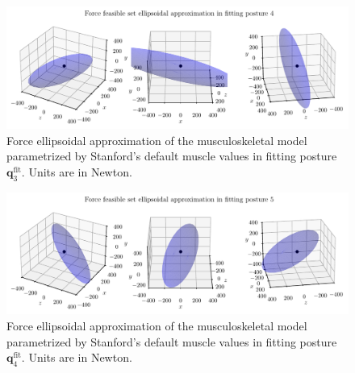 \clearpage
\begin{figure}[!htb]
    \centering
    \captionsetup{justification=centering}
    \begin{minipage}{\linewidth}
        \centering
        \includegraphics[trim={0 0 0 0}, clip, width=1\linewidth]{img/chapter_4/reconstruction_stanford_imgs/STANFORD_ELLIPSOID_POSTURE_FITTING_04.pdf}
    \end{minipage}
    \caption{Force ellipsoidal approximation of the musculoskeletal model parametrized by Stanford's default muscle values in fitting posture $\mathbf{q}_3^{\text{fit}}$. Units are in Newton.}
    \label{fig:ellipsoid_pose_4}
\end{figure}

\begin{figure}[!htb]
    \centering
    \captionsetup{justification=centering}
    \begin{minipage}{\linewidth}
        \centering
        \includegraphics[trim={0 0 0 0}, clip, width=1\linewidth]{img/chapter_4/reconstruction_stanford_imgs/STANFORD_ELLIPSOID_POSTURE_FITTING_05.pdf}
    \end{minipage}
    \caption{Force ellipsoidal approximation of the musculoskeletal model parametrized by Stanford's default muscle values in fitting posture $\mathbf{q}_4^{\text{fit}}$. Units are in Newton.}
    \label{fig:ellipsoid_pose_5}
\end{figure}

